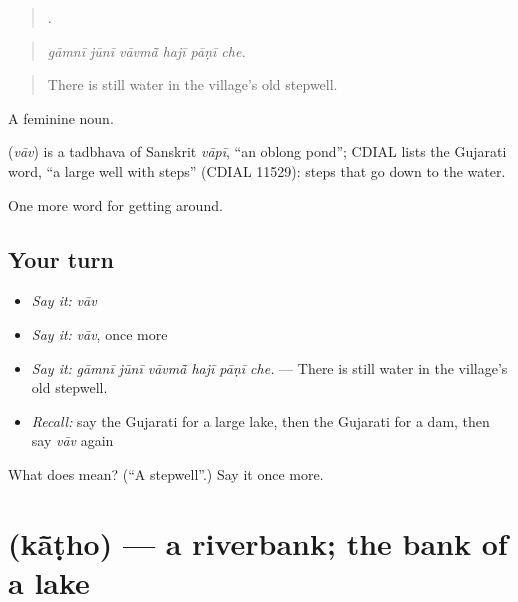 \begin{quote}
     .
\end{quote}

\begin{quote}
\emph{gāmnī jūnī vāvmā̃ hajī pāṇī che.}
\end{quote}

\begin{quote}
There is still water in the village's old stepwell.
\end{quote}

A feminine noun.

\begin{cousinweb}
\textbf{} (\emph{vāv}) is a tadbhava of Sanskrit \emph{vāpī}, \textquotedblleft{}an oblong pond\textquotedblright{}; CDIAL lists the Gujarati word, \textquotedblleft{}a large well with steps\textquotedblright{} (CDIAL 11529): steps that go down to the water.
\end{cousinweb}

\begin{grammarlens}[title={What you've built}]
One more word for getting around.
\end{grammarlens}

\subsection*{Your turn}
\begin{itemize}
\raggedright
  \item \emph{Say it:} \emph{vāv}
  \item \emph{Say it:} \emph{vāv}, once more
  \item \emph{Say it:} \emph{gāmnī jūnī vāvmā̃ hajī pāṇī che.} — There is still water in the village's old stepwell.
  \item \emph{Recall:} say the Gujarati for a large lake, then the Gujarati for a dam, then say \emph{vāv} again
\end{itemize}

\begin{tcolorbox}[breakable,colback=teal!4,colframe=teal!35!black,title={Before you move on}]
What does  mean? (\textquotedblleft{}A stepwell\textquotedblright{}.) Say it once more.
\end{tcolorbox}
\section[\texorpdfstring{\gu{કાંઠો} (kā̃ṭho)}{કાંઠો (kā̃ṭho)}]{ (kā̃ṭho) — a riverbank; the bank of a lake}

